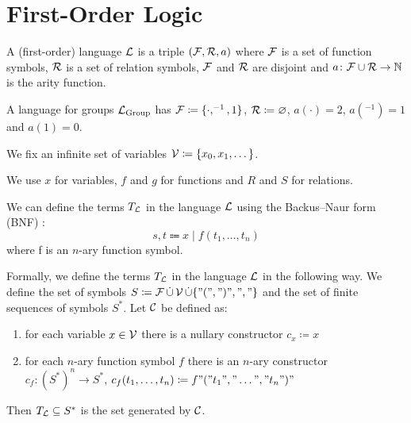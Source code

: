 \section{First-Order Logic}

\begin{defi}
A (first-order) \alert{language $\mathcal{L}$} is a triple $(\mathcal{F}, \mathcal{R}, a)$ where $\mathcal{F}$ is a set of function symbols, $\mathcal{R}$ is a set of relation symbols, $\mathcal{F}$ and $\mathcal{R}$ are disjoint and $a \colon \mathcal{F} \cup \mathcal{R} \to \mathbb{N}$ is the arity function.
\end{defi}

\begin{example}
A language for groups $\mathcal{L}_{\text{Group}}$ has $\mathcal{F} \coloneq \{\cdot, ^{-1}, 1 \}$, $\mathcal{R} \coloneq \varnothing$, $a(\cdot) = 2$, $a(^{-1}) = 1$ and $a(1) = 0$.
\end{example}

\begin{defi}
We fix an infinite set of \alert{variables} $\mathcal{V} \coloneq \{ x_0, x_1, \dots \}$.
\end{defi}

\begin{rem}
We use $x$ for variables, $f$ and $g$ for functions and $R$ and $S$ for relations.
\end{rem}

\begin{defi}
We can define the \alert{terms $T_{\mathcal{L}}$} in the language $\mathcal{L}$ using the \alert{Backus–Naur form (BNF)} : 
\begin{equation*}
    s, t \Coloneqq x \mid f(t_1, \dots, t_n)
\end{equation*}
where f is an $n$-ary function symbol.
\end{defi}

\begin{defi}
Formally, we define the \alert{terms $T_{\mathcal{L}}$} in the language $\mathcal{L}$ in the following way. We define the set of \alert{symbols} $S \coloneq \mathcal{F} \operatorname{\dot{\cup}} \mathcal{V} \operatorname{\dot{\cup}} \{"(", ")", "," \}$ and the set of finite sequences of symbols $S^*$. 
Let $\mathcal{C}$ be defined as: 
\begin{enumerate}
    \item for each variable $x \in \mathcal{V}$ there is a nullary constructor $c_x \coloneq x$
    \item for each $n$-ary function symbol $f$ there is an $n$-ary constructor $c_f \colon (S^*)^n \to S^*$, $c_f(t_1, \dots, t_n) \coloneq f"("t_1"," \dots "," t_n ")"$
\end{enumerate}
Then $T_{\mathcal{L}} \subseteq S^*$ is the set generated by $\mathcal{C}$.
\end{defi}

